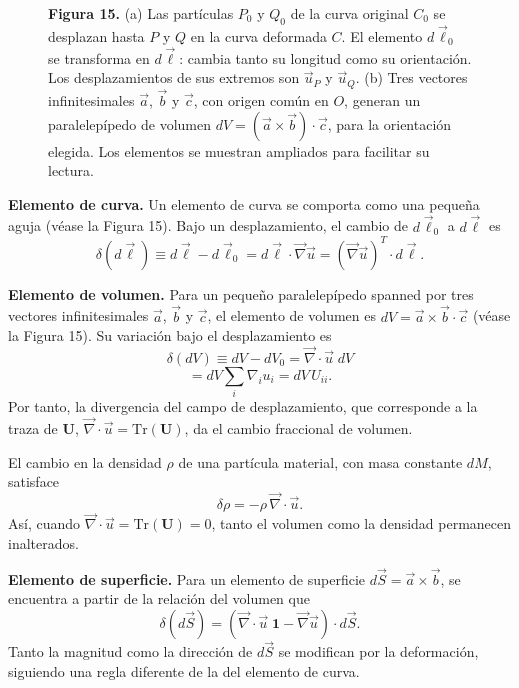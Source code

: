 \begin{figure}[H]
\centering

\par\medskip
\textbf{Figura 15.} (a) Las partículas $P_0$ y $Q_0$ de la curva original $C_0$ se desplazan hasta $P$ y $Q$ en la curva deformada $C$. El elemento $d\vec\ell_0$ se transforma en $d\vec\ell$: cambia tanto su longitud como su orientación. Los desplazamientos de sus extremos son $\vec u_P$ y $\vec u_Q$. (b) Tres vectores infinitesimales $\vec a$, $\vec b$ y $\vec c$, con origen común en $O$, generan un paralelepípedo de volumen $dV=(\vec a\times\vec b)\cdot\vec c$, para la orientación elegida. Los elementos se muestran ampliados para facilitar su lectura.
\end{figure}

\textbf{Elemento de curva.} Un elemento de curva se comporta como una pequeña aguja (véase la Figura 15). Bajo un desplazamiento, el cambio de $d\vec{\ell}_0$ a $d\vec{\ell}$ es
\[ \delta(d\vec{\ell}) \equiv d\vec{\ell} - d\vec{\ell}_0 = d\vec{\ell}\cdot\vec{\nabla}\vec{u} = (\vec{\nabla}\vec{u})^{T}\cdot d\vec{\ell}. \tag{108} \]

\textbf{Elemento de volumen.} Para un pequeño paralelepípedo spanned por tres vectores infinitesimales $\vec{a}$, $\vec{b}$ y $\vec{c}$, el elemento de volumen es $dV = \vec{a}\times\vec{b}\cdot\vec{c}$ (véase la Figura 15). Su variación bajo el desplazamiento es
\[ \delta(dV) \equiv dV - dV_0 = \vec{\nabla}\cdot\vec{u}\; dV \tag{109} \]
\[ = dV \sum_i \nabla_i u_i = dV\,U_{ii}. \tag{110} \]
Por tanto, la divergencia del campo de desplazamiento, que corresponde a la traza de $\mathbf{U}$, $\vec{\nabla}\cdot\vec{u} = \mathrm{Tr}(\mathbf{U})$, da el cambio fraccional de volumen.

El cambio en la densidad $\rho$ de una partícula material, con masa constante $dM$, satisface
\[ \delta\rho = -\rho\,\vec{\nabla}\cdot\vec{u}. \tag{111} \]
Así, cuando $\vec{\nabla}\cdot\vec{u} = \mathrm{Tr}(\mathbf{U}) = 0$, tanto el volumen como la densidad permanecen inalterados.

\textbf{Elemento de superficie.} Para un elemento de superficie $d\vec{S} = \vec{a}\times\vec{b}$, se encuentra a partir de la relación del volumen que
\[ \delta(d\vec{S}) = \left(\vec{\nabla}\cdot\vec{u}\;\mathbf{1} - \vec{\nabla}\vec{u}\right)\cdot d\vec{S}. \tag{112} \]
Tanto la magnitud como la dirección de $d\vec{S}$ se modifican por la deformación, siguiendo una regla diferente de la del elemento de curva.


